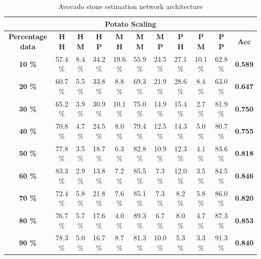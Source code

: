 \documentclass[11pt]{article}
\begin{document}
  \begin{table}[h!]
  \centering
  \begin{adjustbox}{max width=\textwidth}
  \begin{tabular}{*{11}{c}}%
  \hline
  \multicolumn{11}{c}{\textbf{Potato Scaling}}
  \\
 \hline
 \textbf{Percentage data} & \textbf{H H} & \textbf{H M} & \textbf{H P} & \textbf{M H} & \textbf{M M} & \textbf{M P} & \textbf{P H} & \textbf{P M} & \textbf{P P} & \textbf{Acc}\\
 \hline
 \hline
 \textbf{10 \%}  & 57.4 \% & 8.4 \% & 34.2 \% & 19.6 \% & 55.9 \% & 24.5 \% & 27.1 \% & 10.1 \% & 62.8 \% & \textbf{0.589} \\
 \hline
 \textbf{20 \%} & 60.7 \% & 5.5 \% & 33.8 \% & 8.8 \% & 69.3 \% & 21.9 \% & 28.6 \% & 8.4 \% & 63.0 \% & \textbf{0.647} \\
 \hline
 \textbf{30 \%} & 65.2 \% & 3.9 \% & 30.9 \% & 10.1 \% & 75.0 \% & 14.9 \% & 15.4 \% & 2.7 \% & 81.9 \% & \textbf{0.750} \\
 \hline
 \textbf{40 \%} & 70.8 \% & 4.7 \% & 24.5 \% & 8.0 \% & 79.4 \% & 12.5 \% & 14.3 \% & 5.0 \%  & 80.7 \% & \textbf{0.755} \\
 \hline
 \textbf{50 \%} & 77.8 \% & 3.5 \% & 18.7 \% & 6.3 \% & 82.8 \% & 10.9 \% & 12.3 \% & 4.1 \% & 83.6 \% & \textbf{0.818} \\
 \hline
 \textbf{60 \%} & 83.3 \% & 2.9 \% & 13.8 \% & 7.2 \% & 85.5 \% & 7.3 \% & 12.0 \% & 3.5 \% & 84.5 \% & \textbf{0.846} \\
 \hline
 \textbf{70 \%} & 72.4 \% & 5.8 \% & 21.8 \% & 7.6 \% & 85.1 \% & 7.3 \% & 8.2 \% & 5.8 \% & 86.0 \% & \textbf{0.820} \\
 \hline
\textbf{80 \%} & 76.7 \% & 5.7 \% & 17.6 \%  & 4.0 \% & 89.3 \% & 6.7 \% & 8.0 \% & 4.7 \% & 87.3 \% & \textbf{0.853} \\
 \hline
 \textbf{90 \%} & 78.3 \% & 5.0 \% & 16.7 \% & 8.7 \% & 81.3 \% & 10.0 \% & 5.3 \% & 3.3 \% & 91.3 \% & \textbf{0.840} \\
 \hline
\end{tabular}
\end{adjustbox}
  \caption{Avocado stone estimation network architecture}
  \label{tab:experiments_avo_cnn}
\end{table}
\end{document}
